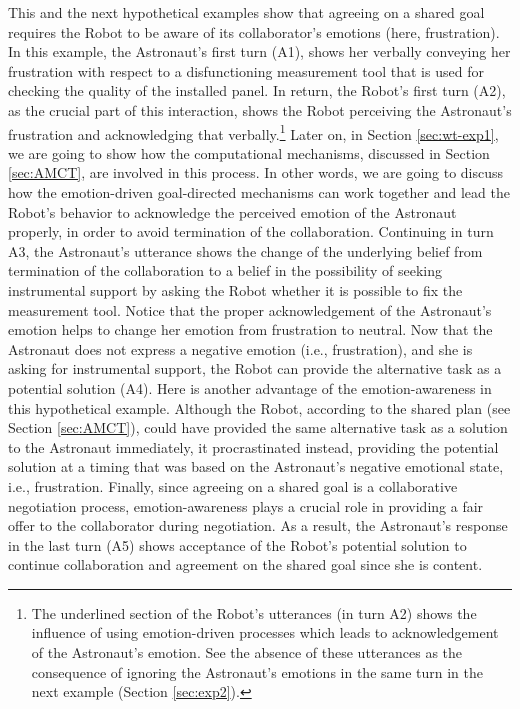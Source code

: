 This and the next hypothetical examples show that agreeing on a shared goal
requires the Robot to be aware of its collaborator's emotions (here,
frustration). In this example, the Astronaut's first turn (A1), shows her
verbally conveying her frustration with respect to a disfunctioning measurement
tool that is used for checking the quality of the installed panel. In return,
the Robot's first turn (A2), as the crucial part of this interaction, shows the
Robot perceiving the Astronaut's frustration and acknowledging that
verbally.\footnote{The underlined section of the Robot's utterances (in turn A2)
shows the influence of using emotion-driven processes which leads to
acknowledgement of the Astronaut's emotion. See the absence of these utterances
as the consequence of ignoring the Astronaut's emotions in the same turn in the
next example (Section \ref{sec:exp2}).} Later on, in Section \ref{sec:wt-exp1},
we are going to show how the computational mechanisms, discussed in Section
\ref{sec:AMCT}, are involved in this process. In other words, we are going to
discuss how the emotion-driven goal-directed mechanisms can work together and
lead the Robot's behavior to acknowledge the perceived emotion of the Astronaut
properly, in order to avoid termination of the collaboration. Continuing in turn
A3, the Astronaut's utterance shows the change of the underlying belief from
termination of the collaboration to a belief in the possibility of seeking
instrumental support by asking the Robot whether it is possible to fix the
measurement tool. Notice that the proper acknowledgement of the Astronaut's
emotion helps to change her emotion from frustration to neutral. Now that the
Astronaut does not express a negative emotion (i.e., frustration), and she is
asking for instrumental support, the Robot can provide the alternative task as a
potential solution (A4). Here is another advantage of the emotion-awareness in
this hypothetical example. Although the Robot, according to the shared plan
(see Section \ref{sec:AMCT}), could have provided the same alternative task as a
solution to the Astronaut immediately, it procrastinated instead, providing the
potential solution at a timing that was based on the Astronaut's negative
emotional state, i.e., frustration. Finally, since agreeing on a shared goal is
a collaborative negotiation process, emotion-awareness plays a crucial role in
providing a fair offer to the collaborator during negotiation. As a result, the
Astronaut's response in the last turn (A5) shows acceptance of the Robot's
potential solution to continue collaboration and agreement on the shared goal
since she is content. 

